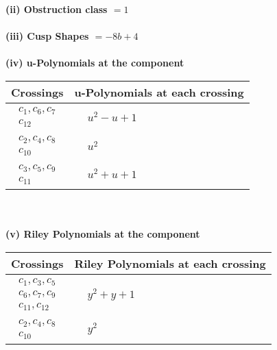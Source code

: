 \documentclass[1p]{elsarticle_modified}
\theoremstyle{definition}
\begin{document}
\flushleft \textbf{(ii) Obstruction class $= 1$}\\~\\
\flushleft \textbf{(iii) Cusp Shapes $= -8 b+4$}\\~\\
\newpage\renewcommand{\arraystretch}{1}
\flushleft \textbf{(iv) u-Polynomials at the component}\newline \\
\begin{tabular}{m{50pt}|m{274pt}}
Crossings & \hspace{64pt}u-Polynomials at each crossing \\
\hline $$\begin{aligned}c_{1},c_{6},c_{7}\\c_{12}\end{aligned}$$&$\begin{aligned}
&u^2- u+1
\end{aligned}$\\
\hline $$\begin{aligned}c_{2},c_{4},c_{8}\\c_{10}\end{aligned}$$&$\begin{aligned}
&u^2
\end{aligned}$\\
\hline $$\begin{aligned}c_{3},c_{5},c_{9}\\c_{11}\end{aligned}$$&$\begin{aligned}
&u^2+u+1
\end{aligned}$\\
\hline
\end{tabular}\\~\\
\newpage\renewcommand{\arraystretch}{1}
\flushleft \textbf{(v) Riley Polynomials at the component}\newline \\
\begin{tabular}{m{50pt}|m{274pt}}
Crossings & \hspace{64pt}Riley Polynomials at each crossing \\
\hline $$\begin{aligned}c_{1},c_{3},c_{5}\\c_{6},c_{7},c_{9}\\c_{11},c_{12}\end{aligned}$$&$\begin{aligned}
&y^2+y+1
\end{aligned}$\\
\hline $$\begin{aligned}c_{2},c_{4},c_{8}\\c_{10}\end{aligned}$$&$\begin{aligned}
&y^2
\end{aligned}$\\
\hline
\end{tabular}\\~\\
\end{document}
